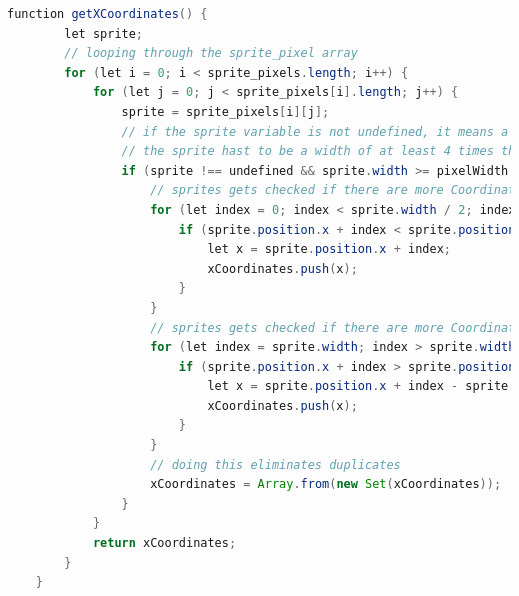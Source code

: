 \begin{lstlisting}[caption=Bestimmung gültiger X-Koordinaten,language=Java,label=lst:impl:xCoords]
    function getXCoordinates() {
        let sprite;
        // looping through the sprite_pixel array
        for (let i = 0; i < sprite_pixels.length; i++) {
            for (let j = 0; j < sprite_pixels[i].length; j++) {
                sprite = sprite_pixels[i][j];
                // if the sprite variable is not undefined, it means a sprite exists there
                // the sprite hast to be a width of at least 4 times the normal pixel width
                if (sprite !== undefined && sprite.width >= pixelWidth * 4) {
                    // sprites gets checked if there are more Coordinates to let an item spawn there (to the right of the center)
                    for (let index = 0; index < sprite.width / 2; index += pixelWidth * 2) {
                        if (sprite.position.x + index < sprite.position.x + sprite.width / 2) {
                            let x = sprite.position.x + index;
                            xCoordinates.push(x);
                        }
                    }
                    // sprites gets checked if there are more Coordinates to let an item spawn there (to the left of the center)
                    for (let index = sprite.width; index > sprite.width / 2; index -= pixelWidth * 2) {
                        if (sprite.position.x + index > sprite.position.x + sprite.width / 2) {
                            let x = sprite.position.x + index - sprite.width;
                            xCoordinates.push(x);
                        }
                    }
                    // doing this eliminates duplicates
                    xCoordinates = Array.from(new Set(xCoordinates));
                }
            }
            return xCoordinates;
        }
    }
\end{lstlisting}

